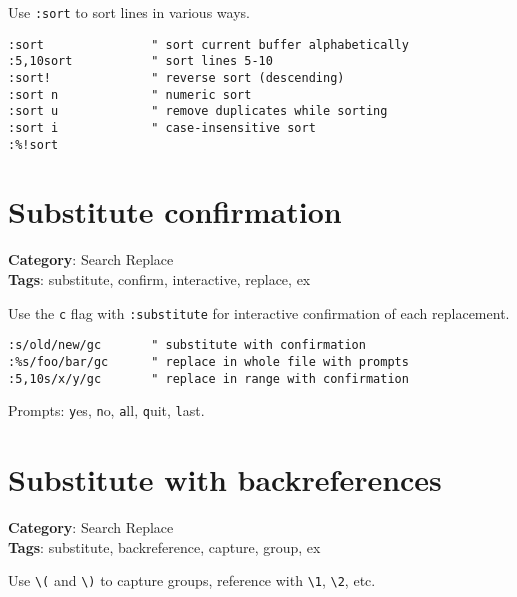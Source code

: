 {{{{{Use {\footnotesize \Verb§:sort§} to sort lines in various ways.

\begin{Exa*}{}
\begin{Verbatim}[fontsize=\footnotesize, breaklines, breakanywhere]
:sort               " sort current buffer alphabetically
:5,10sort           " sort lines 5-10
:sort!              " reverse sort (descending)
:sort n             " numeric sort
:sort u             " remove duplicates while sorting
:sort i             " case-insensitive sort
:%!sort
\end{Verbatim}
\end{Exa*}

\section{Substitute confirmation}

\textbf{Category}: Search Replace\\ \textbf{Tags}: substitute, confirm, interactive, replace, ex
\vspace{0.5cm}

Use the {\footnotesize \Verb§c§} flag with {\footnotesize \Verb§:substitute§} for interactive confirmation of each replacement.

\begin{Exa*}{}
\begin{Verbatim}[fontsize=\footnotesize, breaklines, breakanywhere]
:s/old/new/gc       " substitute with confirmation
:%s/foo/bar/gc      " replace in whole file with prompts
:5,10s/x/y/gc       " replace in range with confirmation
\end{Verbatim}
\end{Exa*}

Prompts: {\footnotesize \Verb§y§}es, {\footnotesize \Verb§n§}o, {\footnotesize \Verb§a§}ll, {\footnotesize \Verb§q§}uit, {\footnotesize \Verb§l§}ast.

\section{Substitute with backreferences}

\textbf{Category}: Search Replace\\ \textbf{Tags}: substitute, backreference, capture, group, ex
\vspace{0.5cm}

Use {\footnotesize \Verb§\(§} and {\footnotesize \Verb§\)§} to capture groups, reference with {\footnotesize \Verb§\1§}, {\footnotesize \Verb§\2§}, etc.

}}}}}
